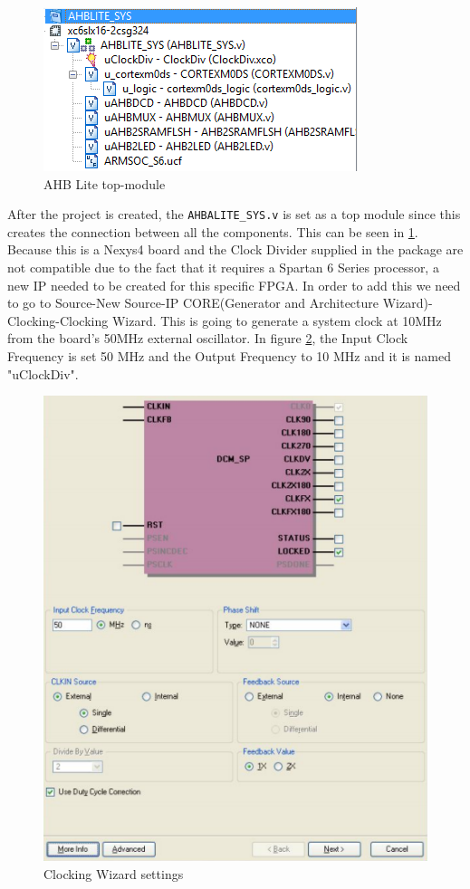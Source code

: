 \begin{figure}
\centering
\includegraphics[scale=0.7]{figures/AHBLITE_SYS_modules_ISE_schematic.PNG}
\caption{AHB Lite top-module } 
\label{fig:ahblite_sys}
\end{figure}

After the project is created, the \verb|AHBALITE_SYS.v| is set as a top module since this creates the connection between all the components. This can be seen in \ref{fig:ahblite_sys}. Because this is a Nexys4 board and the Clock Divider supplied in the package are not compatible due to the fact that it requires a Spartan 6 Series processor, a new IP needed to be created for this specific FPGA. In order to add this we need to go to Source-New Source-IP CORE(Generator and Architecture Wizard)-Clocking-Clocking Wizard. This is going to generate a system clock at 10MHz from the board's 50MHz external oscillator. In figure \ref{fig:clock}, the Input Clock Frequency is set 50 MHz and the Output Frequency to 10 MHz and it is named "uClockDiv".

\begin{figure}
\centering
\includegraphics[scale=0.7]{figures/clock_creation.PNG}
\caption{Clocking Wizard settings } 
\label{fig:clock}
\end{figure}

